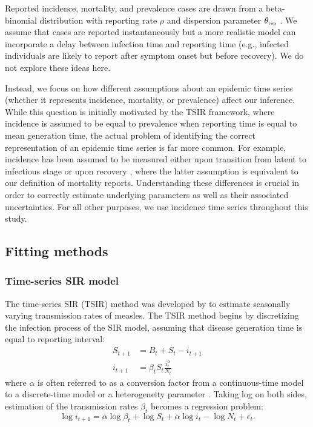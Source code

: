 \documentclass{article}
\newcommand{\tsub}[2]{#1_{{\textrm{\tiny #2}}}}
\begin{document}
Reported incidence, mortality, and prevalence cases are drawn from a beta-binomial distribution with reporting rate $\rho$ and dispersion parameter $\tsub{\theta}{rep}$ \citep{morris1997disentangling}.
We assume that cases are reported instantaneously but a more realistic model can incorporate a delay between infection time and reporting time (e.g., infected individuals are likely to report after symptom onset but before recovery).
We do not explore these ideas here.

Instead, we focus on how different assumptions about an epidemic time series (whether it represents incidence, mortality, or prevalence) affect our inference.
While this question is initially motivated by the TSIR framework, where incidence is assumed to be equal to prevalence when reporting time is equal to mean generation time, the actual problem of identifying the correct representation of an epidemic time series is far more common.
For example, incidence has been assumed to be measured either upon transition from latent to infectious stage \citep{hooker2010parameterizing, althaus2014estimating} or upon recovery \citep{he2009plug}, where the latter assumption is equivalent to our definition of mortality reports.
Understanding these differences is crucial in order to correctly estimate underlying parameters as well as their associated uncertainties.
For all other purposes, we use incidence time series throughout this study.

\subsection{Fitting methods}

\subsubsection*{Time-series SIR model}

The time-series SIR (TSIR) method was developed by \cite{bjornstad2002dynamics} to estimate seasonally varying transmission rates of measles.
The TSIR method begins by discretizing the infection process of the SIR model, assuming that disease generation time is equal to reporting interval:
\begin{equation}\label{eq:tsir_dynamics}
\begin{aligned}
S_{t+1} &= B_t + S_t - i_{t+1}\\
i_{t+1} &= \beta_t S_t \frac{i_t^\alpha}{N_t}
\end{aligned}
\end{equation}
where $\alpha$ is often referred to as a conversion factor from a continuous-time model to a discrete-time model or a heterogeneity parameter \citep{glass2003interpreting}.
Taking log on both sides, estimation of the transmission rates $\beta_t$ becomes a regression problem:
\begin{equation}\label{eq:tsir}
\log i_{t + 1} = \alpha \log \beta_t + \log S_t + \alpha \log i_t - \log N_t + \epsilon_t.
\end{equation}
\end{document}
